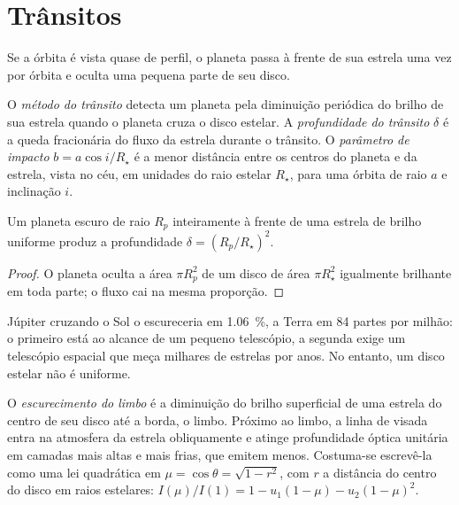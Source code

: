 \section{Trânsitos}\label{sec:b3:exoplanets:transits}

Se a órbita é vista quase de perfil, o planeta passa à frente de
sua estrela uma vez por órbita e oculta uma pequena parte de seu disco.

\begin{definition}\label{def:b3:exoplanets:transit}
O \emph{método do trânsito} detecta um planeta pela
diminuição periódica do brilho de sua estrela quando o planeta cruza o disco estelar. A
\emph{profundidade do trânsito} $\delta$ é a queda fracionária
do fluxo da estrela durante o trânsito. O \emph{parâmetro de
impacto} $b = a\cos i/R_\star$ é a
menor distância entre os centros do planeta e da estrela, vista no céu,
em unidades do raio estelar $R_\star$, para uma órbita de raio
$a$ e inclinação $i$.
\end{definition}

\begin{proposition}\label{prop:b3:exoplanets:depth}
Um planeta escuro de raio $R_p$ inteiramente à frente de uma estrela de brilho uniforme
produz a profundidade $\delta = (R_p/R_\star)^2$.
\end{proposition}

\begin{proof}
O planeta oculta a área $\pi R_p^2$ de um disco de área $\pi R_\star^2$
igualmente brilhante em toda parte; o fluxo cai na mesma proporção.
\end{proof}

Júpiter cruzando o Sol o escureceria em \qty{1.06}{\percent}, a Terra
em \num{84} partes por milhão: o primeiro está ao alcance de um pequeno
telescópio, a segunda exige um telescópio espacial que meça milhares de
estrelas por anos. No entanto, um disco estelar não é uniforme.

\begin{definition}\label{def:b3:exoplanets:limb}
O \emph{escurecimento do limbo} é a diminuição do
brilho superficial de uma estrela do centro de seu disco até a borda, o limbo.
Próximo ao limbo, a linha de visada entra na atmosfera da estrela obliquamente
e atinge profundidade óptica unitária em camadas mais altas e mais frias, que emitem
menos. Costuma-se escrevê-la como uma lei quadrática em $\mu = \cos\theta =
\sqrt{1 - r^2}$, com $r$ a distância do centro do disco em raios estelares:
$I(\mu)/I(1) = 1 - u_1(1 - \mu) - u_2(1 - \mu)^2$.
\end{definition}

